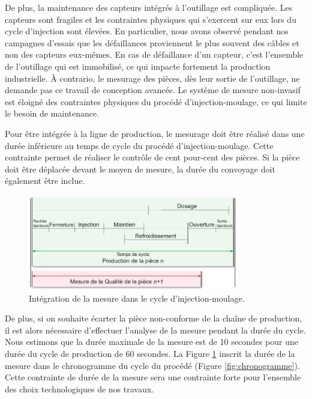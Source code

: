 De plus, la maintenance des capteurs intégrés à l'outillage est compliquée.
Les capteurs sont fragiles et les contraintes physiques qui s'exercent sur eux lors du cycle d'injection sont élevées.
En particulier, nous avons observé pendant nos campagnes d'essais que les défaillances proviennent le plus souvent des câbles et non des capteurs eux-mêmes.
En cas de défaillance d'un capteur, c'est l'ensemble de l'outillage qui est immobilisé, ce qui impacte fortement la production industrielle.
À contrario, le mesurage des pièces, dès leur sortie de l'outillage, ne demande pas ce travail de conception avancée.
Le système de mesure non-invasif est éloigné des contraintes physiques du procédé d'injection-moulage, ce qui limite le besoin de maintenance.

Pour être intégrée à la ligne de production, le mesurage doit être réalisé dans une durée inférieure au temps de cycle du procédé d'injection-moulage.
Cette contrainte permet de réaliser le contrôle de cent pour-cent des pièces.
Si la pièce doit être déplacée devant le moyen de mesure, la durée du convoyage doit également être inclue.

\begin{figure}[tbhp]
	\centering
	\includegraphics[width=0.82\textwidth,height=\textheight,keepaspectratio]{../Chap1/Figures/SAPRISTI_Chronogramme-Simple.pdf}
	\caption{Intégration de la mesure dans le cycle d'injection-moulage.}
	\label{fig:time_constraint}
\end{figure}

De plus, si on souhaite écarter la pièce non-conforme de la chaîne de production, il est alors nécessaire d'effectuer l'analyse de la mesure pendant la durée du cycle.
Nous estimons que la durée maximale de la mesure est de 10 secondes pour une durée du cycle de production de 60 secondes.
La Figure \ref{fig:time_constraint} inscrit la durée de la mesure dans le chronogramme du cycle du procédé (Figure \ref{fig:chronogramme}).
Cette contrainte de durée de la mesure sera une contrainte forte pour l'ensemble des choix technologiques de nos travaux.

